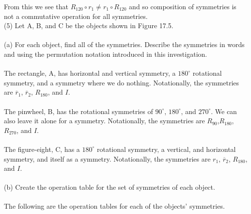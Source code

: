 \documentclass[11pt,a4paper]{article}
\begin{document}
From this we see that $ R_{120}\circ r_1 \neq r_1\circ R_{120}$ and so composition of symmetries is not a commutative operation for all symmetries.\\

(5) Let A, B, and C be the objects shown in Figure 17.5.\\
\newpage
~\vspace{15mm}\\

(a) For each object, find all of the symmetries. Describe the symmetries in words and using the permutation notation introduced in this investigation.\\
~\\
The rectangle, A, has horizontal and vertical symmetry, a $180^\circ$ rotational symmetry, and a symmetry where we do nothing. Notationally, the symmetries are $\overline{r}_1$, $\overline{r}_2$, $R_{180}$, and $I$.\\
~\\
The pinwheel, B, has the rotational symmetries of $90^\circ$, $180^\circ$, and $270^\circ$. We can also leave it alone for a symmetry. Notationally, the symmetries are $R_{90}$,$R_{180}$, $R_{270}$, and $I$.\\
~\\
The figure-eight, C, has a $180^\circ$ rotational symmetry, a vertical, and horizontal symmetry, and itself as a symmetry. Notationally, the symmetries are $r_1$, $\overline{r}_2$, $R_{180}$, and $I$.\\
~\\
(b) Create the operation table for the set of symmetries of each object.\\
~\\
The following are the operation tables for each of the objects' symmetries.\\
~\\
\end{document}
